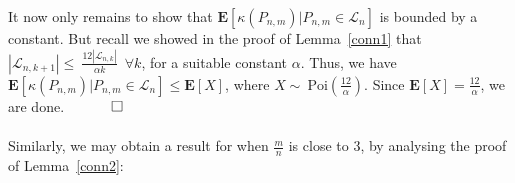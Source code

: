 \documentclass{article}
\newtheorem{Proof of Theorem}{Proof of Theorem}
\begin{document}
It now only remains to show that 
$\mathbf{E}[\kappa (P_{n,m}) | P_{n,m} \in \mathcal{L}_{n}]$
is bounded by a constant.
But recall we showed in the proof of Lemma~\ref{conn1} that 
$|\mathcal{L}_{n,k+1}| \!\leq~\!\frac{12 |\mathcal{L}_{n,k}|}{ \alpha k}$~$\forall k$,
for a suitable constant $\alpha$.
Thus, we have
$\mathbf{E}[\kappa (P_{n,m}) | P_{n,m} \in \mathcal{L}_{n}] \leq
\mathbf{E}[X]$,
where $X \sim~\textrm{Poi} \left( \frac{12}{\alpha} \right)$.
Since $\mathbf{E}[X] = \frac{12}{\alpha}$,
we are done.
$\phantom{qwerty}
\setlength{\unitlength}{.25cm}
\begin{picture}(1,1)
\put(0,0){\line(1,0){1}}
\put(0,0){\line(0,1){1}}
\put(1,1){\line(-1,0){1}}
\put(1,1){\line(0,-1){1}}
\end{picture}$
\\
\\




















Similarly,
we may obtain a result for when $\frac{m}{n}$ is close to $3$,
by analysing the proof of Lemma~\ref{conn2}:
\end{document}
